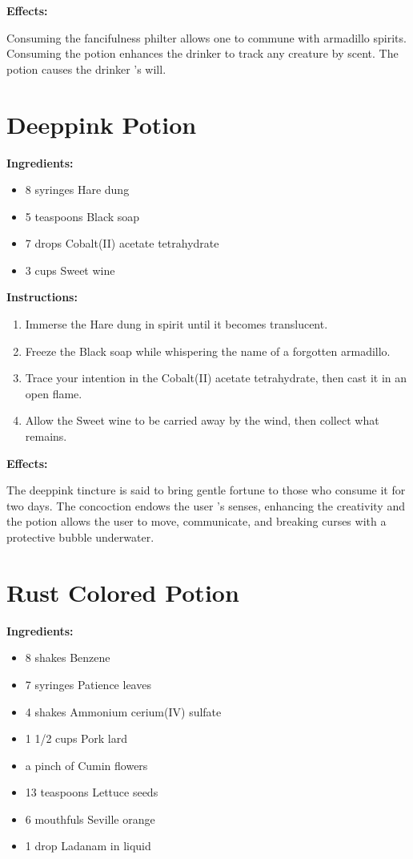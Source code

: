 \documentclass{article}
\begin{document}
\textbf{Effects:}

Consuming the fancifulness philter allows one to commune with armadillo spirits. Consuming the potion enhances the drinker to track any creature by scent. The potion causes the drinker 's will.

\newpage
\section*{Deeppink Potion}

\textbf{Ingredients:}

\begin{itemize}
  \item 8 syringes Hare dung
  \item 5 teaspoons Black soap
  \item 7 drops Cobalt(II) acetate tetrahydrate
  \item 3 cups Sweet wine
\end{itemize}

\textbf{Instructions:}

\begin{enumerate}
  \item Immerse the Hare dung in spirit until it becomes translucent.
  \item Freeze the Black soap while whispering the name of a forgotten armadillo.
  \item Trace your intention in the Cobalt(II) acetate tetrahydrate, then cast it in an open flame.
  \item Allow the Sweet wine to be carried away by the wind, then collect what remains.
\end{enumerate}

\textbf{Effects:}

The deeppink tincture is said to bring gentle fortune to those who consume it for two days. The concoction endows the user 's senses, enhancing the creativity and the potion allows the user to move, communicate, and breaking curses with a protective bubble underwater.

\newpage
\section*{Rust Colored Potion}

\textbf{Ingredients:}

\begin{itemize}
  \item 8 shakes Benzene
  \item 7 syringes Patience leaves
  \item 4 shakes Ammonium cerium(IV) sulfate
  \item 1 1/2 cups Pork lard
  \item a pinch of Cumin flowers
  \item 13 teaspoons Lettuce seeds
  \item 6 mouthfuls Seville orange
  \item 1 drop Ladanam in liquid
\end{itemize}
\end{document}
